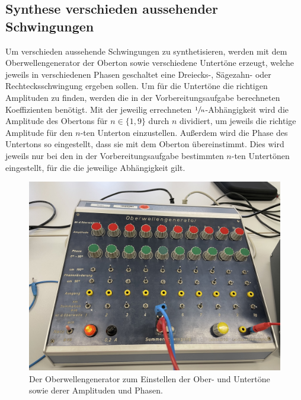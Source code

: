 \subsection{Synthese verschieden aussehender Schwingungen}
Um verschieden aussehende Schwingungen zu synthetisieren, werden mit dem Oberwellengenerator der Oberton sowie verschiedene
Untertöne erzeugt, welche jeweils in verschiedenen Phasen geschaltet eine Dreiecks-, Sägezahn- oder Rechtecksschwingung
ergeben sollen. Um für die Untertöne die richtigen Amplituden zu finden, werden die in der Vorbereitungsaufgabe berechneten 
Koeffizienten benötigt. Mit der jeweilig errechneten $\sfrac{1}{n}$-Abhängigkeit wird die Amplitude des Obertons für $n\in\{1,9\}$ durch $n$ dividiert, um 
jeweils die richtige Amplitude für den $n$-ten Unterton einzustellen. Außerdem wird die Phase des Untertons so eingestellt, dass sie mit
dem Oberton übereinstimmt. Dies wird jeweils nur bei den in der Vorbereitungsaufgabe bestimmten $n$-ten 
Untertönen eingestellt, für die die jeweilige Abhängigkeit gilt.
\begin{figure}[H]
    \centering
    \includegraphics[scale=0.06]{Messdaten_Bilder/Oberwellengenerator.jpeg}
    \caption{Der Oberwellengenerator zum Einstellen der Ober- und Untertöne sowie derer Amplituden und Phasen.}
    \label{fig:Oberwelle}
\end{figure}

